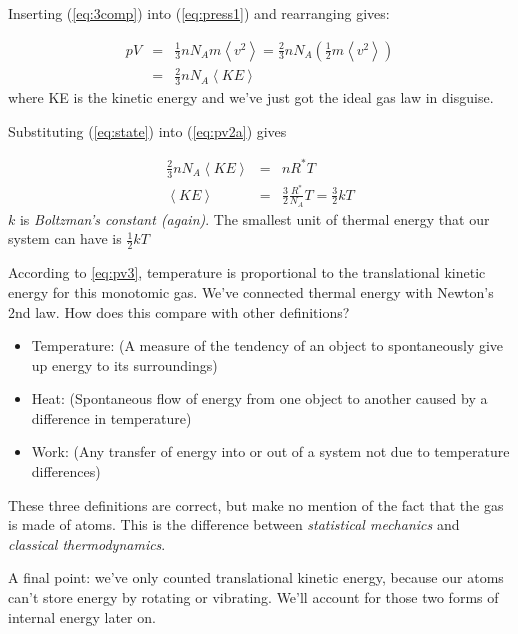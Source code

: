 \documentclass[12pt]{article}
\begin{document}
Inserting (\ref{eq:3comp}) into (\ref{eq:press1}) and rearranging gives:

\begin{subequations}
\label{pv2}
  \begin{eqnarray}
    pV &=& \frac{1}{3} n N_A m \left < v^2  \right > = \frac{2}{3} n N_A 
             (\frac{1}{2} m \left < v^2 \right >) \label{eq:pv2a} \\
   &=& \frac{2}{3} n N_A \left < KE \right >
  \end{eqnarray}
\end{subequations}
where KE is the kinetic energy and we've just got the ideal gas law in disguise.

\par 

Substituting (\ref{eq:state}) into (\ref{eq:pv2a}) gives

\begin{subequations}
  \begin{eqnarray}
    \label{eq:pv3}
     \frac{2}{3} n N_A \left < KE \right > &=& n R^* T\label{eq:pv3a} \\
    \left < KE \right > &=& \frac{3}{2} \frac {R^*}{N_A} T = \frac{ 3}{2} kT
  \end{eqnarray}
\end{subequations}
$k$ is \textit{Boltzman's constant (again)}.
The smallest unit of thermal energy that our system can have
is $\frac{ 1}{2} k T$

According to \eqref{eq:pv3}, temperature is proportional to
the translational kinetic energy for this monotomic gas.  We've connected
thermal energy with Newton's 2nd law.  How does this
compare with other definitions?

\begin{itemize}

\item Temperature: (A measure of the tendency of an object to spontaneously
give up energy to its surroundings)
\item Heat: (Spontaneous flow of energy from one object to another
caused by a difference in temperature)
\item Work: (Any transfer of energy into or out of a system not due to temperature differences)

\end{itemize}

These three definitions are correct, but make no mention of the fact
that the gas is made of atoms.  This is the difference between
\textit{statistical mechanics} and \textit{classical thermodynamics}.

A final point:  we've only counted translational kinetic energy, because our atoms can't store
energy by rotating or vibrating.  We'll account for those two forms of internal energy
later on.
\end{document}
